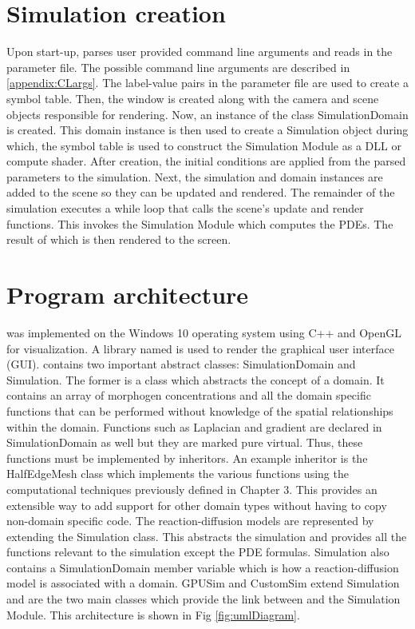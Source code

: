 \section{Simulation creation}
Upon start-up, \ProgramName{} parses user provided command line arguments and reads in the parameter file. The possible command line arguments are described in \ref{appendix:CLargs}. The label-value pairs in the parameter file are used to create a symbol table. Then, the window is created along with the camera and scene objects responsible for rendering. Now, an instance of the class SimulationDomain is created. This domain instance is then used to create a Simulation object during which, the symbol table is used to construct the Simulation Module as a DLL or compute shader. After creation, the initial conditions are applied from the parsed parameters to the simulation. Next, the simulation and domain instances are added to the scene so they can be updated and rendered. The remainder of the simulation executes a while loop that calls the scene's update and render functions. This invokes the Simulation Module which computes the PDEs. The result of which is then rendered to the screen.


\section{Program architecture} 
\ProgramName{} was implemented on the Windows 10 operating system using C++ and OpenGL for visualization. A library named  \citep{Cornut2019} is used to render the graphical user interface (GUI). \ProgramName{} contains two important abstract classes: SimulationDomain and Simulation. The former is a class which abstracts the concept of a domain. It contains an array of morphogen concentrations and all the domain specific functions that can be performed without knowledge of the spatial relationships within the domain. Functions such as Laplacian and gradient are declared in SimulationDomain as well but they are marked pure virtual. Thus, these functions must be implemented by inheritors. An example inheritor is the HalfEdgeMesh class which implements the various functions using the computational techniques previously defined in Chapter 3. This provides an extensible way to add support for other domain types without having to copy non-domain specific code. The reaction-diffusion models are represented by extending the Simulation class. This abstracts the simulation and provides all the functions relevant to the simulation except the PDE formulas. Simulation also contains a SimulationDomain member variable which is how a reaction-diffusion model is associated with a domain. GPUSim and CustomSim extend Simulation and are the two main classes which provide the link between \ProgramName{} and the Simulation Module. This architecture is shown in Fig \ref{fig:umlDiagram}.


